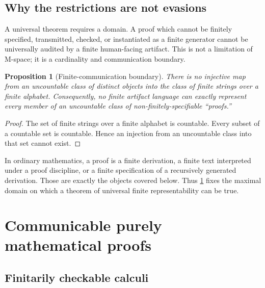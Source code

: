 \documentclass[11pt]{article}
\theoremstyle{plain}
\newtheorem{proposition}[theorem]{Proposition}
\theoremstyle{definition}
\theoremstyle{remark}
\begin{document}
\subsection{Why the restrictions are not evasions}

A universal theorem requires a domain.  A proof which cannot be finitely specified, transmitted, checked, or instantiated as a finite generator cannot be universally audited by a finite human-facing artifact.  This is not a limitation of M-space; it is a cardinality and communication boundary.

\begin{proposition}[Finite-communication boundary]
\label{prop:finite-boundary}
There is no injective map from an uncountable class of distinct objects into the class of finite strings over a finite alphabet.  Consequently, no finite artifact language can exactly represent every member of an uncountable class of non-finitely-specifiable ``proofs.''
\end{proposition}

\begin{proof}
The set of finite strings over a finite alphabet is countable.  Every subset of a countable set is countable.  Hence an injection from an uncountable class into that set cannot exist.
\end{proof}

In ordinary mathematics, a proof is a finite derivation, a finite text interpreted under a proof discipline, or a finite specification of a recursively generated derivation.  Those are exactly the objects covered below.  Thus \cref{prop:finite-boundary} fixes the maximal domain on which a theorem of universal finite representability can be true.

\section{Communicable purely mathematical proofs}
\label{sec:proofs}

\subsection{Finitarily checkable calculi}
\end{document}
